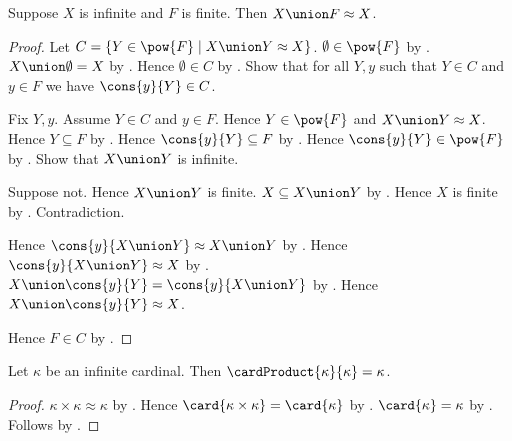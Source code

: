 \begin{theorem}\label{infinite_finite_union_equinumerous}
    Suppose $X$ is infinite and $F$ is finite.
    Then $X\union F\approx X$.
\end{theorem}
\begin{proof}
    Let $C=\{Y\in\pow{F}\mid X\union Y\approx X\}$.
    $\emptyset\in\pow{F}$ by .
    $X\union\emptyset=X$ by .
    Hence $\emptyset\in C$ by .
    Show that for all $Y,y$ such that $Y\in C$ and $y\in F$ we have
        $\cons{y}{Y}\in C$.
    \begin{subproof}
        Fix $Y,y$.
        Assume $Y\in C$ and $y\in F$.
        Hence $Y\in\pow{F}$ and $X\union Y\approx X$.
        Hence $Y\subseteq F$ by .
        Hence $\cons{y}{Y}\subseteq F$ by .
        Hence $\cons{y}{Y}\in\pow{F}$ by .
        Show that $X\union Y$ is infinite.
        \begin{subproof}
            Suppose not.
            Hence $X\union Y$ is finite.
            $X\subseteq X\union Y$ by .
            Hence $X$ is finite by .
            Contradiction.
        \end{subproof}
        Hence $\cons{y}{X\union Y}\approx X\union Y$
            by .
        Hence $\cons{y}{X\union Y}\approx X$ by .
        $X\union\cons{y}{Y}=\cons{y}{X\union Y}$
            by .
        Hence $X\union\cons{y}{Y}\approx X$.
    \end{subproof}
    Hence $F\in C$ by .
\end{proof}

\begin{theorem}\label{infinite_cardinal_product_square}
    Let $\kappa$ be an infinite cardinal.
    Then $\cardProduct{\kappa}{\kappa}=\kappa$.
\end{theorem}
\begin{proof}
    $\kappa\times\kappa\approx\kappa$
        by .
    Hence $\card{\kappa\times\kappa}=\card{\kappa}$
        by .
    $\card{\kappa}=\kappa$ by .
    Follows by .
\end{proof}

